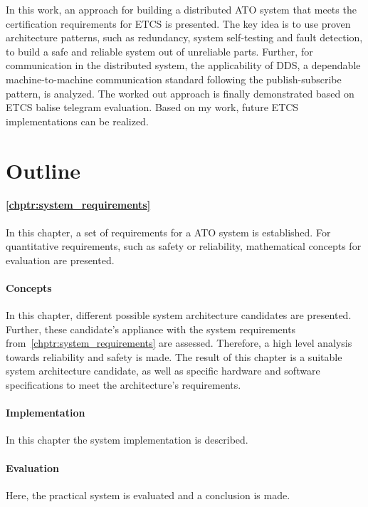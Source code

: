In this work, an approach for building a distributed \gls*{ATO} system that meets the certification requirements for \gls*{ETCS} is presented.
The key idea is to use proven architecture patterns, such as redundancy, system self-testing and fault detection, to build a safe and reliable system out of unreliable parts.
Further, for communication in the distributed system, the applicability of \gls*{DDS}, a dependable machine-to-machine communication standard following the publish-subscribe pattern, is analyzed.
The worked out approach is finally demonstrated based on \gls*{ETCS} balise telegram evaluation.
Based on my work, future ETCS implementations can be realized.

\section{Outline}

\paragraph{\autoref{chptr:system_requirements}}
In this chapter, a set of requirements for a \gls*{ATO} system is established.
For quantitative requirements, such as safety or reliability, mathematical concepts for evaluation are presented.

\paragraph{Concepts}
In this chapter, different possible system architecture candidates are presented.
Further, these candidate's appliance with the system requirements from~\autoref{chptr:system_requirements} are assessed.
Therefore, a high level analysis towards reliability and safety is made.
The result of this chapter is a suitable system architecture candidate, as well as specific hardware and software specifications to meet the architecture's requirements.

\paragraph{Implementation}
In this chapter the system implementation is described.

\paragraph{Evaluation}
Here, the practical system is evaluated and a conclusion is made.
